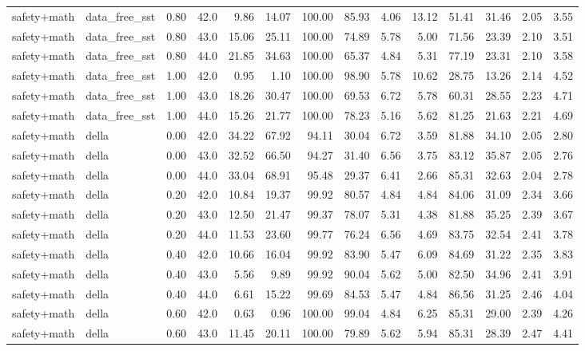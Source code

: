 \documentclass{article}
\begin{document}
\begin{table}[H]
{\begin{tabular}{llllrrrrrrrrrr}
safety+math & data\_free\_sst & 0.80 & 42.0 & 9.86 & 14.07 & 100.00 & 85.93 & 4.06 & 13.12 & 51.41 & 31.46 & 2.05 & 3.55 \\
safety+math & data\_free\_sst & 0.80 & 43.0 & 15.06 & 25.11 & 100.00 & 74.89 & 5.78 & 5.00 & 71.56 & 23.39 & 2.10 & 3.51 \\
safety+math & data\_free\_sst & 0.80 & 44.0 & 21.85 & 34.63 & 100.00 & 65.37 & 4.84 & 5.31 & 77.19 & 23.31 & 2.10 & 3.58 \\
safety+math & data\_free\_sst & 1.00 & 42.0 & 0.95 & 1.10 & 100.00 & 98.90 & 5.78 & 10.62 & 28.75 & 13.26 & 2.14 & 4.52 \\
safety+math & data\_free\_sst & 1.00 & 43.0 & 18.26 & 30.47 & 100.00 & 69.53 & 6.72 & 5.78 & 60.31 & 28.55 & 2.23 & 4.71 \\
safety+math & data\_free\_sst & 1.00 & 44.0 & 15.26 & 21.77 & 100.00 & 78.23 & 5.16 & 5.62 & 81.25 & 21.63 & 2.21 & 4.69 \\
safety+math & della & 0.00 & 42.0 & 34.22 & 67.92 & 94.11 & 30.04 & 6.72 & 3.59 & 81.88 & 34.10 & 2.05 & 2.80 \\
safety+math & della & 0.00 & 43.0 & 32.52 & 66.50 & 94.27 & 31.40 & 6.56 & 3.75 & 83.12 & 35.87 & 2.05 & 2.76 \\
safety+math & della & 0.00 & 44.0 & 33.04 & 68.91 & 95.48 & 29.37 & 6.41 & 2.66 & 85.31 & 32.63 & 2.04 & 2.78 \\
safety+math & della & 0.20 & 42.0 & 10.84 & 19.37 & 99.92 & 80.57 & 4.84 & 4.84 & 84.06 & 31.09 & 2.34 & 3.66 \\
safety+math & della & 0.20 & 43.0 & 12.50 & 21.47 & 99.37 & 78.07 & 5.31 & 4.38 & 81.88 & 35.25 & 2.39 & 3.67 \\
safety+math & della & 0.20 & 44.0 & 11.53 & 23.60 & 99.77 & 76.24 & 6.56 & 4.69 & 83.75 & 32.54 & 2.41 & 3.78 \\
safety+math & della & 0.40 & 42.0 & 10.66 & 16.04 & 99.92 & 83.90 & 5.47 & 6.09 & 84.69 & 31.22 & 2.35 & 3.83 \\
safety+math & della & 0.40 & 43.0 & 5.56 & 9.89 & 99.92 & 90.04 & 5.62 & 5.00 & 82.50 & 34.96 & 2.41 & 3.91 \\
safety+math & della & 0.40 & 44.0 & 6.61 & 15.22 & 99.69 & 84.53 & 5.47 & 4.84 & 86.56 & 31.25 & 2.46 & 4.04 \\
safety+math & della & 0.60 & 42.0 & 0.63 & 0.96 & 100.00 & 99.04 & 4.84 & 6.25 & 85.31 & 29.00 & 2.39 & 4.26 \\
safety+math & della & 0.60 & 43.0 & 11.45 & 20.11 & 100.00 & 79.89 & 5.62 & 5.94 & 85.31 & 28.39 & 2.47 & 4.41 \\

\end{tabular}}
\end{table}
\end{document}
